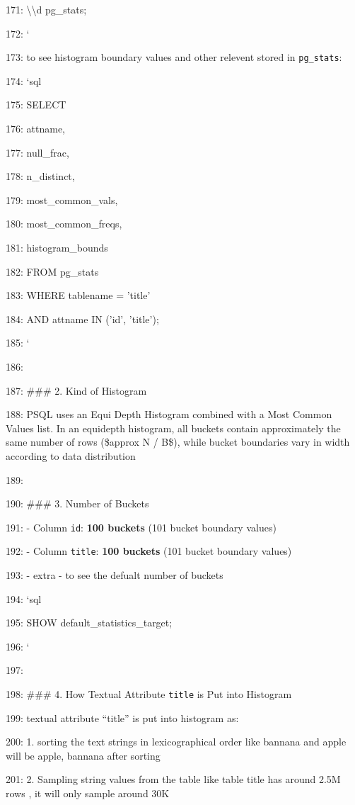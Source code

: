 \documentclass[11pt,a4paper]{article}
\begin{document}
171: \textbackslash{}\textbackslash{}d pg\_stats;

172: \texttt{}`

173: to see histogram boundary values and other relevent  stored in \texttt{pg\_stats}:

174: \texttt{}`sql

175: SELECT

176:     attname,

177:     null\_frac,

178:     n\_distinct,

179:     most\_common\_vals,

180:     most\_common\_freqs,

181:     histogram\_bounds

182: FROM pg\_stats

183: WHERE tablename = 'title'

184:   AND attname IN ('id', 'title');

185: \texttt{}`

186:

187: \#\#\# 2. Kind of Histogram

188: PSQL uses an Equi Depth Histogram combined with a Most Common Values list. In an equidepth histogram, all buckets contain approximately the same number of rows (\$approx N / B\$), while bucket boundaries vary in width according to data distribution

189:

190: \#\#\# 3. Number of Buckets

191: - Column \texttt{id}: \textbf{100 buckets} (101 bucket boundary values)

192: - Column \texttt{title}: \textbf{100 buckets} (101 bucket boundary values)

193: - extra -  to see the defualt number of buckets

194: \texttt{}`sql

195: SHOW default\_statistics\_target;

196: \texttt{}`

197:

198: \#\#\# 4. How Textual Attribute \texttt{title} is Put into Histogram

199: textual attribute “title” is put into histogram as:

200: 1. sorting the text strings in lexicographical order like bannana and apple will be apple, bannana after sorting

201: 2. Sampling string values from the table like table title has around 2.5M rows , it will only sample around 30K
\end{document}
